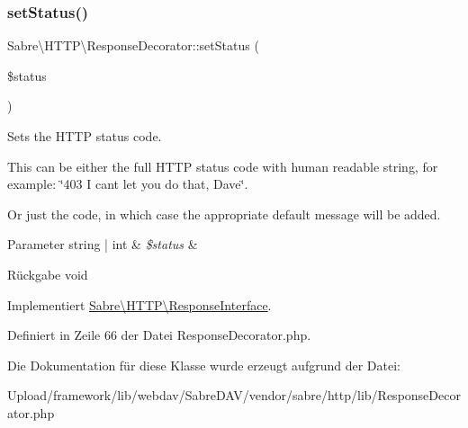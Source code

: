 \subsubsection{\texorpdfstring{set\+Status()}{setStatus()}}
{\footnotesize\ttfamily Sabre\textbackslash{}\+H\+T\+T\+P\textbackslash{}\+Response\+Decorator\+::set\+Status (\begin{DoxyParamCaption}\item[{}]{\$status }\end{DoxyParamCaption})}

Sets the H\+T\+TP status code.

This can be either the full H\+T\+TP status code with human readable string, for example\+: \char`\"{}403 I can\textquotesingle{}t let you do that, Dave\char`\"{}.

Or just the code, in which case the appropriate default message will be added.


\begin{DoxyParams}[1]{Parameter}
string | int & {\em \$status} & \\
\hline
\end{DoxyParams}
\begin{DoxyReturn}{Rückgabe}
void 
\end{DoxyReturn}


Implementiert \mbox{\hyperlink{interface_sabre_1_1_h_t_t_p_1_1_response_interface_a918855cfff846d31ac733011952839c8}{Sabre\textbackslash{}\+H\+T\+T\+P\textbackslash{}\+Response\+Interface}}.



Definiert in Zeile 66 der Datei Response\+Decorator.\+php.



Die Dokumentation für diese Klasse wurde erzeugt aufgrund der Datei\+:\begin{DoxyCompactItemize}
\item 
Upload/framework/lib/webdav/\+Sabre\+D\+A\+V/vendor/sabre/http/lib/Response\+Decorator.\+php\end{DoxyCompactItemize}
